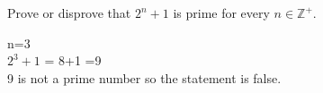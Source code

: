 \documentclass[a4paper]{exam}
\theoremstyle{definition}
\newcommand\Z{\ensuremath{\mathbb{Z}}}
\begin{document}
\begin{questions}
\begin{solution}
    
  \end{solution}

\question 
  Prove or disprove that $2^n + 1$ is prime for every $n\in\Z^+$.

  \begin{solution}
    
    n=3\\
    $2^3 + 1$ = 8+1 =9\\
    9 is not a prime number so the statement is false.
  \end{solution}
\end{questions}
\end{document}
